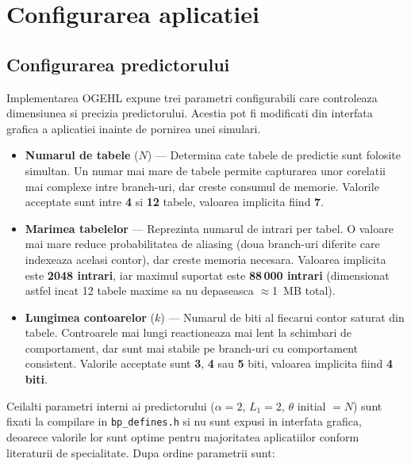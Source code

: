 \section{Configurarea aplicatiei}

\subsection{Configurarea predictorului}
\label{sec:config_hw}

Implementarea OGEHL expune trei parametri configurabili care controleaza
dimensiunea si precizia predictorului. Acestia pot fi modificati din interfata
grafica a aplicatiei inainte de pornirea unei simulari.

\begin{itemize}
    \item \textbf{Numarul de tabele} ($N$) --- Determina cate tabele de
          predictie sunt folosite simultan. Un numar mai mare de tabele
          permite capturarea unor corelatii mai complexe intre branch-uri,
          dar creste consumul de memorie. Valorile acceptate sunt intre
          \textbf{4} si \textbf{12} tabele, valoarea implicita fiind
          \textbf{7}.

    \item \textbf{Marimea tabelelor} --- Reprezinta numarul de intrari per
          tabel. O valoare mai mare reduce probabilitatea de aliasing
          (doua branch-uri diferite care indexeaza acelasi contor), dar
          creste memoria necesara. Valoarea implicita este
          \textbf{2048 intrari}, iar maximul suportat este
          \textbf{88\,000 intrari} (dimensionat astfel incat 12 tabele
          maxime sa nu depaseasca $\approx$1~MB total).

    \item \textbf{Lungimea contoarelor} ($k$) --- Numarul de biti al
          fiecarui contor saturat din tabele. Controarele mai lungi
          reactioneaza mai lent la schimbari de comportament, dar sunt
          mai stabile pe branch-uri cu comportament consistent. Valorile
          acceptate sunt \textbf{3}, \textbf{4} sau \textbf{5} biti,
          valoarea implicita fiind \textbf{4 biti}.
\end{itemize}

Ceilalti parametri interni ai predictorului ($\alpha = 2$, $L_1 = 2$,
$\theta$ initial $= N$) sunt fixati la compilare in
\texttt{bp\_defines.h} si nu sunt expusi in interfata grafica, deoarece
valorile lor sunt optime pentru majoritatea aplicatiilor conform
literaturii de specialitate\cite{seznec2004gehl}. Dupa ordine parametrii sunt:

